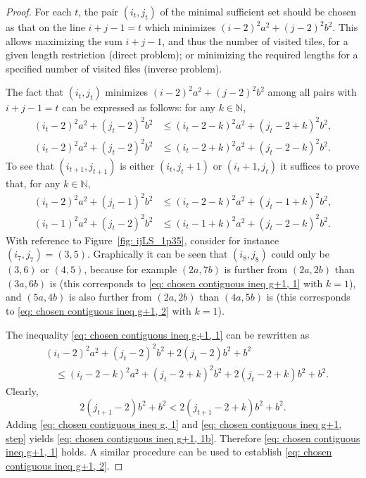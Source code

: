 \documentclass[12pt, a4paper]{article}
\newcommand{\tiles}{t} %
\newcommand{\touched}{visited}
\begin{document}
\begin{proof}
For each $\tiles$, the pair $(i_\tiles,j_\tiles)$ of the minimal sufficient set should be chosen as that on the line $i+j-1=\tiles$ which minimizes $(i-2)^2 a^2 + (j-2)^2 b^2$. This allows maximizing the sum $i+j-1$, and thus the number of \touched{} tiles, for a given length restriction (direct problem); or minimizing the required lengths for a specified number of \touched{} files (inverse problem).

The fact that $(i_t,j_t)$ minimizes $(i-2)^2 a^2 + (j-2)^2 b^2$ among all pairs with $i+j-1=\tiles$ can be expressed as follows: for any $k \in \mathbb N$,
\begin{align}
\label{eq: chosen contiguous ineq g, 1}
(i_\tiles-2)^2 a^2 + (j_\tiles-2)^2 b^2 &\leq (i_\tiles-2-k)^2 a^2 + (j_\tiles-2+k)^2 b^2, \\
\label{eq: chosen contiguous ineq g, 2}
(i_\tiles-2)^2 a^2 + (j_\tiles-2)^2 b^2 &\leq (i_\tiles-2+k)^2 a^2 + (j_\tiles-2-k)^2 b^2.
\end{align}
To see that $(i_{\tiles+1},j_{\tiles+1})$ is either $(i_\tiles,j_\tiles+1)$ or $(i_\tiles+1,j_\tiles)$ it suffices to prove that, for any $k \in \mathbb N$,
\begin{align}
\label{eq: chosen contiguous ineq g+1, 1}
(i_{\tiles}-2)^2 a^2 + (j_{\tiles}-1)^2 b^2 &\leq (i_{\tiles}-2-k)^2 a^2 + (j_{\tiles}-1+k)^2 b^2, \\
\label{eq: chosen contiguous ineq g+1, 2}
(i_{\tiles}-1)^2 a^2 + (j_{\tiles}-2)^2 b^2 &\leq (i_{\tiles}-1+k)^2 a^2 + (j_{\tiles}-2-k)^2 b^2.
\end{align}
With reference to Figure~\ref{fig: ijLS_1p35}, consider for instance $(i_7,j_7) = (3,5)$. Graphically it can be seen that $(i_8,j_8)$ could only be $(3,6)$ or $(4,5)$, because for example $(2a,7b)$ is further from $(2a,2b)$ than $(3a,6b)$ is (this corresponds to \eqref{eq: chosen contiguous ineq g+1, 1} with $k=1$), and $(5a,4b)$ is also further from $(2a,2b)$ than $(4a,5b)$ is (this corresponds to \eqref{eq: chosen contiguous ineq g+1, 2} with $k=1$).

The inequality \eqref{eq: chosen contiguous ineq g+1, 1} can be rewritten as
\begin{equation}
\label{eq: chosen contiguous ineq g+1, 1b}
\begin{split}
& (i_{\tiles}-2)^2 a^2 + (j_{\tiles}-2)^2 b^2 + 2(j_{\tiles}-2)b^2 + b^2 \\
& \quad \leq (i_{\tiles}-2-k)^2 a^2 + (j_{\tiles}-2+k)^2 b^2 + 2(j_{\tiles}-2+k) b^2 + b^2.
\end{split}
\end{equation}
Clearly,
\begin{equation}
\label{eq: chosen contiguous ineq g+1, step}
2(j_{\tiles+1}-2)b^2 + b^2 < 2(j_{\tiles+1}-2+k) b^2 + b^2.
\end{equation}
Adding \eqref{eq: chosen contiguous ineq g, 1} and \eqref{eq: chosen contiguous ineq g+1, step} yields \eqref{eq: chosen contiguous ineq g+1, 1b}. Therefore \eqref{eq: chosen contiguous ineq g+1, 1} holds. A similar procedure can be used to establish \eqref{eq: chosen contiguous ineq g+1, 2}.


\end{proof}
\end{document}
